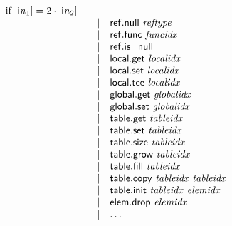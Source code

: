 $$\begin{array}{@{}lrrl@{}l@{}}
  \mbox{if}~{|{{\mathsf{i}}{{\mathit{n}}}}_{{1}}|} = 2 \cdot {|{{\mathsf{i}}{{\mathit{n}}}}_{{2}}|} \\ &&|&
\mathsf{ref.null}~{\mathit{reftype}} \\ &&|&
\mathsf{ref.func}~{\mathit{funcidx}} \\ &&|&
\mathsf{ref.is\_null} \\ &&|&
\mathsf{local.get}~{\mathit{localidx}} \\ &&|&
\mathsf{local.set}~{\mathit{localidx}} \\ &&|&
\mathsf{local.tee}~{\mathit{localidx}} \\ &&|&
\mathsf{global.get}~{\mathit{globalidx}} \\ &&|&
\mathsf{global.set}~{\mathit{globalidx}} \\ &&|&
\mathsf{table.get}~{\mathit{tableidx}} \\ &&|&
\mathsf{table.set}~{\mathit{tableidx}} \\ &&|&
\mathsf{table.size}~{\mathit{tableidx}} \\ &&|&
\mathsf{table.grow}~{\mathit{tableidx}} \\ &&|&
\mathsf{table.fill}~{\mathit{tableidx}} \\ &&|&
\mathsf{table.copy}~{\mathit{tableidx}}~{\mathit{tableidx}} \\ &&|&
\mathsf{table.init}~{\mathit{tableidx}}~{\mathit{elemidx}} \\ &&|&
\mathsf{elem.drop}~{\mathit{elemidx}} \\ &&|&
\dots \\
\end{array}
$$

\vspace{1ex}

